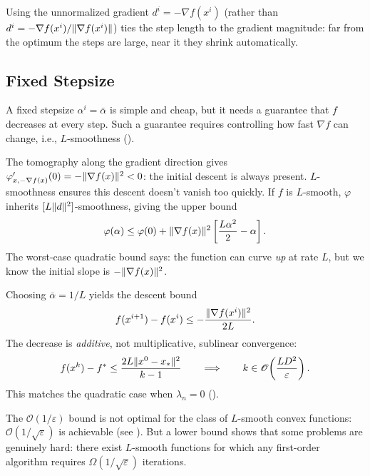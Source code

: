 Using the unnormalized gradient $d^i = -\nabla f(x^i)$ (rather than $d^i = -\nabla f(x^i)/\lVert\nabla f(x^i)\rVert$) ties the step length to the gradient magnitude: far from the optimum the steps are large, near it they shrink automatically.


\subsection{Fixed Stepsize}\label{sec:fixed-stepsize}

A fixed stepsize $\alpha^i = \bar{\alpha}$ is simple and cheap, but it needs a guarantee that $f$ decreases at every step.
Such a guarantee requires controlling how fast $\nabla f$ can change, i.e., $L$-smoothness ().

The tomography along the gradient direction gives $\varphi'_{x,-\nabla f(x)}(0) = -\lVert\nabla f(x)\rVert^2 < 0$: the initial descent is always present.
$L$-smoothness ensures this descent doesn't vanish too quickly.
If $f$ is $L$-smooth, $\varphi$ inherits $[L\lVert d\rVert^2]$-smoothness, giving the upper bound
\begin{equation}\label{eq:tomography-upper-bound}
	\varphi(\alpha) \leq \varphi(0) + \lVert\nabla f(x)\rVert^2 \left[\frac{L\alpha^2}{2} - \alpha\right].
\end{equation}
The worst-case quadratic bound says: the function can curve \emph{up} at rate $L$, but we know the initial slope is $-\lVert\nabla f(x)\rVert^2$.

Choosing $\bar{\alpha} = 1/L$ yields the descent bound
\begin{equation}\label{eq:fixed-step-descent}
	f(x^{i+1}) - f(x^i) \leq -\frac{\lVert\nabla f(x^i)\rVert^2}{2L}.
\end{equation}
The decrease is \emph{additive}, not multiplicative, sublinear convergence:
\begin{equation}\label{eq:sublinear-smooth}
	f(x^k) - f^* \leq \frac{2L\lVert x^0 - x_*\rVert^2}{k - 1}
	\qquad \Longrightarrow \qquad
	k \in \mathcal{O}\!\left(\frac{LD^2}{\varepsilon}\right).
\end{equation}
This matches the quadratic case when $\lambda_n = 0$ ().

The $\mathcal{O}(1/\varepsilon)$ bound is not optimal for the class of $L$-smooth convex functions: $\mathcal{O}(1/\sqrt{\varepsilon})$ is achievable (see ).
But a lower bound shows that some problems are genuinely hard: there exist $L$-smooth functions for which any first-order algorithm requires $\Omega(1/\sqrt{\varepsilon})$ iterations.


